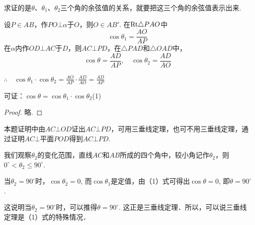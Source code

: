 \begin{figure}[htp]
    \centering
{}
    \caption{}
\end{figure}

\begin{analyze}
求证的是$\theta$、$\theta_1$、$\theta_2$三个角的余弦值的关系，就要把这三个角的余弦值表示出来.

设$P\in AB$，作$PO\bot\alpha$于$O$，则$O\in  AB'$. 在${\rm Rt}\triangle PAO$中
\[\cos\theta_1=\frac{AO}{AP}\]
在$\alpha$内作$OD\bot AC$于$D$，则$AC\bot PD$，在$\triangle PAD$和$\triangle OAD$中，
\[\cos\theta=\frac{AD}{AP},\quad \cos\theta_2=\frac{AD}{AO}\]

$\therefore\quad \cos\theta_1\cdot\cos\theta_2=\frac{AO}{AP}\cdot \frac{AD}{AO}=\frac{AD}{AP}$

可证：$\cos\theta=\cos\theta_1\cdot \cos\theta_2$\hfill (1)
\end{analyze}

\begin{proof}
略.
\end{proof}

\begin{remark}
    本题证明中由$AC\bot OD$证出$AC\bot PD$，可用三垂线定理，也可不用三垂线定理，通过证明$AC\bot $平面$POD$得到$AC\bot PD$.
    
    我们观察$\theta_2$的变化范围，直线$AC$和$AB$所成的四个角中，较小角记作$\theta_2$，则$0^{\circ}<\theta_2\le 90^{\circ}$.

当$\theta_2=90^{\circ}$时，$\cos\theta_2=0$, 而$\cos\theta_1$是定值，由（1）式可得出$\cos\theta=0$, 即$\theta=90^{\circ}$.

这说明当$\theta_2=90^{\circ}$时，可以推得$\theta=90^{\circ}$. 这正是三垂线定理．所以，可以说三垂线定理是（1）式的特殊情况．
\end{remark}

